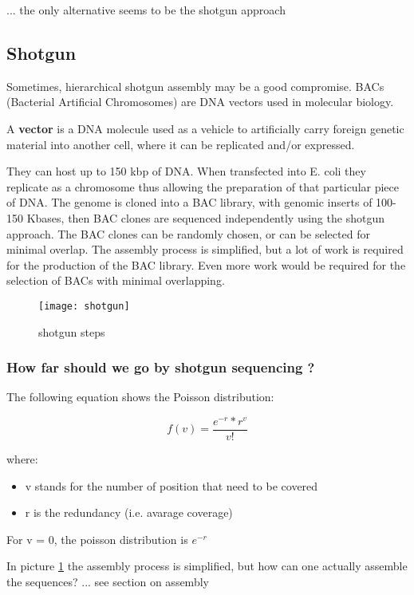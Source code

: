 ... the only alternative seems to be the shotgun approach

\subsection{Shotgun}

Sometimes, hierarchical shotgun assembly may be a good compromise. 
BACs (Bacterial Artificial Chromosomes) are DNA vectors used in molecular
biology.

A \textbf{vector} is a DNA molecule used as a vehicle to artificially
carry foreign genetic material into another cell, where it can be replicated
and/or expressed. 

They can host up to 150 kbp of DNA. 
When transfected into E. coli they replicate as a chromosome thus allowing
the preparation of that particular piece of DNA.
The genome is cloned into a BAC library, with genomic inserts of 100-150 Kbases,
then BAC clones are sequenced independently using the shotgun approach.
The BAC clones can be randomly chosen, or can be selected for minimal overlap.
The assembly process is simplified, but a lot of work is required for the production of the BAC library.
Even more work would be required for the selection of BACs with minimal overlapping.

\begin{figure}[H]
  \centering
  \texttt{[image: shotgun]}
  \caption{shotgun steps}
  \label{fig:shotgun}
\end{figure}

\subsubsection{How far should we go by shotgun sequencing ? }

The following equation shows the Poisson distribution:

\begin{equation}
f(v) = \frac{e^{-r}*r^v}{v!}
\end{equation}

where:

\begin{itemize}
  \item v stands for the number of position that need to be covered
  \item r is the redundancy (i.e. avarage coverage)
\end{itemize}

For v = 0, the poisson distribution is $e^{-r}$

In picture \ref{fig:shotgun} the assembly process is simplified,
but how can one actually assemble the sequences?
... see section on assembly
